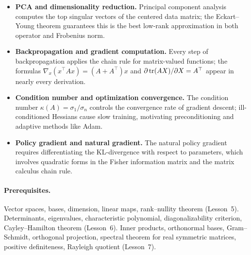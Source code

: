 \documentclass[11pt,a4paper]{article}
\begin{document}
\begin{rlconnection}[title={Where SVD, Norms, and Matrix Calculus Appear in RL/ML}]
\begin{itemize}[nosep]
  \item \textbf{PCA and dimensionality reduction.}
        Principal component analysis computes the top singular vectors
        of the centered data matrix; the Eckart--Young theorem guarantees
        this is the best low-rank approximation in both operator and
        Frobenius norm.
  \item \textbf{Backpropagation and gradient computation.}
        Every step of backpropagation applies the chain rule for
        matrix-valued functions; the formulas $\nabla_x(x^\top A x)
        = (A + A^\top)x$ and $\partial \operatorname{tr}(AX)/\partial X = A^\top$
        appear in nearly every derivation.
  \item \textbf{Condition number and optimization convergence.}
        The condition number $\kappa(A) = \sigma_1/\sigma_n$ controls
        the convergence rate of gradient descent; ill-conditioned
        Hessians cause slow training, motivating preconditioning and
        adaptive methods like Adam.
  \item \textbf{Policy gradient and natural gradient.}
        The natural policy gradient requires differentiating the
        KL-divergence with respect to parameters, which involves
        quadratic forms in the Fisher information matrix and the
        matrix calculus chain rule.
\end{itemize}
\end{rlconnection}

\paragraph{Prerequisites.}
Vector spaces, bases, dimension, linear maps, rank--nullity theorem
(Lesson~5).  Determinants, eigenvalues, characteristic polynomial,
diagonalizability criterion, Cayley--Hamilton theorem (Lesson~6).
Inner products, orthonormal bases, Gram--Schmidt, orthogonal
projection, spectral theorem for real symmetric matrices, positive
definiteness, Rayleigh quotient (Lesson~7).
\end{document}
